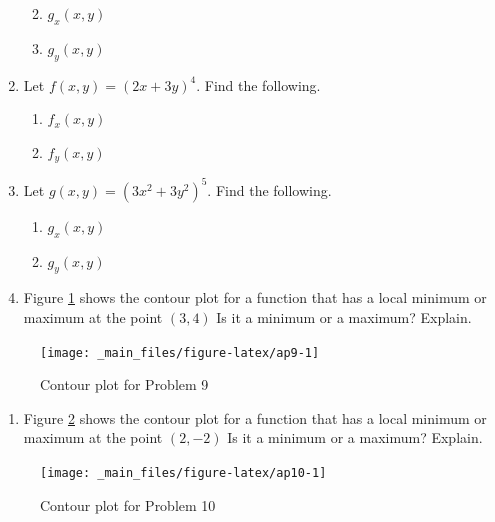 \documentclass[
]{book}
\providecommand{\tightlist}{%
  \setlength{\itemsep}{0pt}\setlength{\parskip}{0pt}}
\theoremstyle{definition}
\theoremstyle{definition}
\theoremstyle{definition}
\theoremstyle{definition}
\theoremstyle{remark}
\begin{document}
\begin{enumerate}
  \begin{enumerate}
  \def\labelenumii{\alph{enumii}.}
  \tightlist
  \item
    \(g_x(x,y)\)
  \item
    \(g_y(x,y)\)
  \end{enumerate}
\item
  Let \(f(x,y)=(2x+3y)^4.\) Find the following.

  \begin{enumerate}
  \def\labelenumii{\alph{enumii}.}
  \tightlist
  \item
    \(f_x(x,y)\)
  \item
    \(f_y(x,y)\)
  \end{enumerate}
\item
  Let \(g(x,y)=(3x^2+3y^2)^5.\) Find the following.

  \begin{enumerate}
  \def\labelenumii{\alph{enumii}.}
  \tightlist
  \item
    \(g_x(x,y)\)
  \item
    \(g_y(x,y)\)
  \end{enumerate}
\item
  Figure \ref{fig:ap9} shows the contour plot for a function that has a local minimum or maximum at the point \((3,4)\) Is it a minimum or a maximum? Explain.
\end{enumerate}

\begin{figure}

{\centering \texttt{[image: \_main\_files/figure-latex/ap9-1]} 

}

\caption{Contour plot for Problem 9}\label{fig:ap9}
\end{figure}

\begin{enumerate}
\def\labelenumi{\arabic{enumi}.}
\setcounter{enumi}{9}
\tightlist
\item
  Figure \ref{fig:ap10} shows the contour plot for a function that has a local minimum or maximum at the point \((2,-2)\) Is it a minimum or a maximum? Explain.
\end{enumerate}

\begin{figure}

{\centering \texttt{[image: \_main\_files/figure-latex/ap10-1]} 

}

\caption{Contour plot for Problem 10}\label{fig:ap10}
\end{figure}
\end{document}
